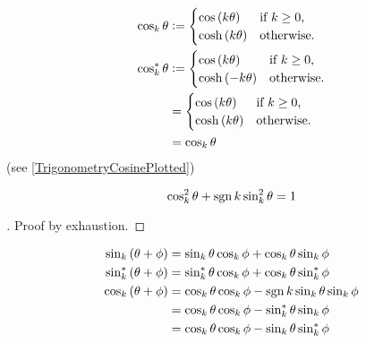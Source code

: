 \documentclass[stu, babel, american, biblatex, a4paper, leqno, draftall]{apa7}
\begin{document}
\begin{example}\label{M:Trigonometry:Cosine}
    \begin{align*}
        \cos_k{\theta}      & \vcentcolon=
        \begin{cases}
            \cos\left(k\theta\right)  & \text{if $k\geq0$,} \\
            \cosh\left(k\theta\right) & \text{otherwise.}   \\
        \end{cases}                         \\
        \cos_k^\ast{\theta} & \vcentcolon=
        \begin{cases}
            \cos\left(k\theta\right)   & \text{if $k\geq0$,} \\
            \cosh\left(-k\theta\right) & \text{otherwise.}   \\
        \end{cases}                        \\
                            & = \begin{cases}
                                    \cos\left(k\theta\right)  & \text{if $k\geq0$,} \\
                                    \cosh\left(k\theta\right) & \text{otherwise.}   \\
                                \end{cases} \\
                            & = \cos_k{\theta}
    \end{align*}
    (see \cref{TrigonometryCosinePlotted})
\end{example}
\begin{theorem}\label{M:Trigonometry:Pythagorean}
    \begin{equation*}
        \cos_k^2{\theta} +\operatorname{sgn}{k}\sin_k^2{\theta} = 1
    \end{equation*}
\end{theorem}
\begin{proof}[]
    Proof by exhaustion.
\end{proof}
\begin{proposition}\label{M:Trigonometry:Sum}
    \begin{align*}
        \sin_k\left(\theta+\phi\right)
         & = \sin_k{\theta}\cos_k{\phi}+\cos_k{\theta}\sin_k{\phi}           \\
        \sin_k^\ast\left(\theta+\phi\right)
         & = \sin_k^\ast{\theta}\cos_k{\phi}+\cos_k{\theta}\sin_k^\ast{\phi} \\
        \cos_k\left(\theta+\phi\right)
         & = \cos_k{\theta}\cos_k{\phi}-\operatorname{sgn}{k}\sin_k{\theta}\sin_k{\phi}   \\
         & = \cos_k{\theta}\cos_k{\phi}-\sin_k^\ast{\theta}\sin_k{\phi}      \\
         & = \cos_k{\theta}\cos_k{\phi}-\sin_k{\theta}\sin_k^\ast{\phi}
    \end{align*}
\end{proposition}
\end{document}
